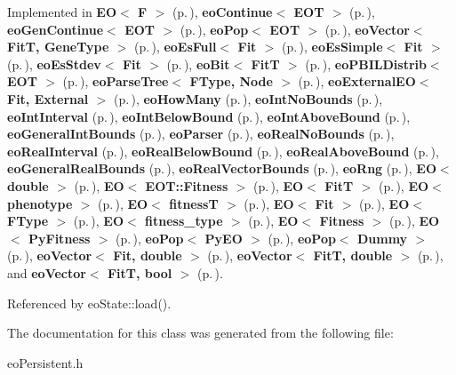 Implemented in {\bf EO$<$ F $>$} {\rm (p.\,\pageref{class_e_o_z10_1})}, {\bf eo\-Continue$<$ EOT $>$} {\rm (p.\,\pageref{classeo_continue_a1})}, {\bf eo\-Gen\-Continue$<$ EOT $>$} {\rm (p.\,\pageref{classeo_gen_continue_a6})}, {\bf eo\-Pop$<$ EOT $>$} {\rm (p.\,\pageref{classeo_pop_z19_0})}, {\bf eo\-Vector$<$ Fit\-T, Gene\-Type $>$} {\rm (p.\,\pageref{classeo_vector_a5})}, {\bf eo\-Es\-Full$<$ Fit $>$} {\rm (p.\,\pageref{classeo_es_full_a3})}, {\bf eo\-Es\-Simple$<$ Fit $>$} {\rm (p.\,\pageref{classeo_es_simple_a3})}, {\bf eo\-Es\-Stdev$<$ Fit $>$} {\rm (p.\,\pageref{classeo_es_stdev_a3})}, {\bf eo\-Bit$<$ Fit\-T $>$} {\rm (p.\,\pageref{classeo_bit_a3})}, {\bf eo\-PBILDistrib$<$ EOT $>$} {\rm (p.\,\pageref{classeo_p_b_i_l_distrib_a4})}, {\bf eo\-Parse\-Tree$<$ FType, Node $>$} {\rm (p.\,\pageref{classeo_parse_tree_a6})}, {\bf eo\-External\-EO$<$ Fit, External $>$} {\rm (p.\,\pageref{classeo_external_e_o_a3})}, {\bf eo\-How\-Many} {\rm (p.\,\pageref{classeo_how_many_a6})}, {\bf eo\-Int\-No\-Bounds} {\rm (p.\,\pageref{classeo_int_no_bounds_a13})}, {\bf eo\-Int\-Interval} {\rm (p.\,\pageref{classeo_int_interval_a14})}, {\bf eo\-Int\-Below\-Bound} {\rm (p.\,\pageref{classeo_int_below_bound_a14})}, {\bf eo\-Int\-Above\-Bound} {\rm (p.\,\pageref{classeo_int_above_bound_a14})}, {\bf eo\-General\-Int\-Bounds} {\rm (p.\,\pageref{classeo_general_int_bounds_a19})}, {\bf eo\-Parser} {\rm (p.\,\pageref{classeo_parser_a2})}, {\bf eo\-Real\-No\-Bounds} {\rm (p.\,\pageref{classeo_real_no_bounds_a12})}, {\bf eo\-Real\-Interval} {\rm (p.\,\pageref{classeo_real_interval_a13})}, {\bf eo\-Real\-Below\-Bound} {\rm (p.\,\pageref{classeo_real_below_bound_a13})}, {\bf eo\-Real\-Above\-Bound} {\rm (p.\,\pageref{classeo_real_above_bound_a13})}, {\bf eo\-General\-Real\-Bounds} {\rm (p.\,\pageref{classeo_general_real_bounds_a18})}, {\bf eo\-Real\-Vector\-Bounds} {\rm (p.\,\pageref{classeo_real_vector_bounds_a7})}, {\bf eo\-Rng} {\rm (p.\,\pageref{classeo_rng_a17})}, {\bf EO$<$ double $>$} {\rm (p.\,\pageref{class_e_o_z10_1})}, {\bf EO$<$ EOT::Fitness $>$} {\rm (p.\,\pageref{class_e_o_z10_1})}, {\bf EO$<$ Fit\-T $>$} {\rm (p.\,\pageref{class_e_o_z10_1})}, {\bf EO$<$ phenotype $>$} {\rm (p.\,\pageref{class_e_o_z10_1})}, {\bf EO$<$ fitness\-T $>$} {\rm (p.\,\pageref{class_e_o_z10_1})}, {\bf EO$<$ Fit $>$} {\rm (p.\,\pageref{class_e_o_z10_1})}, {\bf EO$<$ FType $>$} {\rm (p.\,\pageref{class_e_o_z10_1})}, {\bf EO$<$ fitness\_\-type $>$} {\rm (p.\,\pageref{class_e_o_z10_1})}, {\bf EO$<$ Fitness $>$} {\rm (p.\,\pageref{class_e_o_z10_1})}, {\bf EO$<$ Py\-Fitness $>$} {\rm (p.\,\pageref{class_e_o_z10_1})}, {\bf eo\-Pop$<$ Py\-EO $>$} {\rm (p.\,\pageref{classeo_pop_z19_0})}, {\bf eo\-Pop$<$ Dummy $>$} {\rm (p.\,\pageref{classeo_pop_z19_0})}, {\bf eo\-Vector$<$ Fit, double $>$} {\rm (p.\,\pageref{classeo_vector_a5})}, {\bf eo\-Vector$<$ Fit\-T, double $>$} {\rm (p.\,\pageref{classeo_vector_a5})}, and {\bf eo\-Vector$<$ Fit\-T, bool $>$} {\rm (p.\,\pageref{classeo_vector_a5})}.

Referenced by eo\-State::load().

The documentation for this class was generated from the following file:\begin{CompactItemize}
\item 
eo\-Persistent.h\end{CompactItemize}
